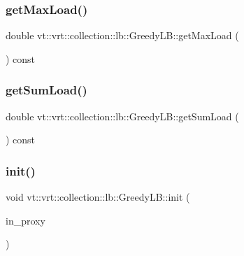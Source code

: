 \subsubsection{\texorpdfstring{get\+Max\+Load()}{getMaxLoad()}}
{\footnotesize\ttfamily double vt\+::vrt\+::collection\+::lb\+::\+Greedy\+L\+B\+::get\+Max\+Load (\begin{DoxyParamCaption}{ }\end{DoxyParamCaption}) const\hspace{0.3cm}{\ttfamily [private]}}

\mbox{\label{structvt_1_1vrt_1_1collection_1_1lb_1_1_greedy_l_b_a2e9f213874f7eecc81a09f2b1ceb5291}} 
\subsubsection{\texorpdfstring{get\+Sum\+Load()}{getSumLoad()}}
{\footnotesize\ttfamily double vt\+::vrt\+::collection\+::lb\+::\+Greedy\+L\+B\+::get\+Sum\+Load (\begin{DoxyParamCaption}{ }\end{DoxyParamCaption}) const\hspace{0.3cm}{\ttfamily [private]}}

\mbox{\label{structvt_1_1vrt_1_1collection_1_1lb_1_1_greedy_l_b_abfbe5625bf35d88c192aa46b83c4670a}} 
\subsubsection{\texorpdfstring{init()}{init()}}
{\footnotesize\ttfamily void vt\+::vrt\+::collection\+::lb\+::\+Greedy\+L\+B\+::init (\begin{DoxyParamCaption}\item[{\hyperlink{structvt_1_1objgroup_1_1proxy_1_1_proxy}{objgroup\+::proxy\+::\+Proxy}$<$ \hyperlink{structvt_1_1vrt_1_1collection_1_1lb_1_1_greedy_l_b}{Greedy\+LB} $>$}]{in\+\_\+proxy }\end{DoxyParamCaption})}

